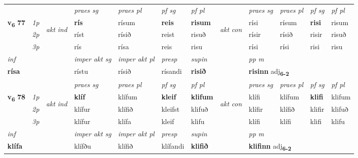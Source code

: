 \begin{longtable}[l]{X>{\footnotesize\itshape}llXXXXlXXXX}
 & &   & \textit{praes sg}  & \textit{praes pl}    & \textit{ pf sg} & \textit{pf pl} & & \textit{praes sg}  & \textit{praes pl}    & \textit{pf sg} & \textit{pf pl }  \\ \cmidrule{4-7} \cmidrule{9-12}
 \multirow{2}{*}{{{\textbf{v{\textsubscript{6}}} \Large{\textbf{77}}}}}  & 1p & \multirow{3}{*}{\begin{turn}{90}\textit{akt ind}\end{turn}} & \textbf{rís} & rísum & \textbf{reis} & \textbf{risum} & \multirow{3}{*}{\begin{turn}{90}\textit{akt con}\end{turn}} &rísi & rísum & \textbf{risi} & risum\\*
 & 2p &  &  ríst  & rísið & reist & risuð & & rísir & rísið & risir & risuð \\*
 & 3p &  & rís & rísa & reis & risu & & rísi & rísi& risi & risu \\*
\cmidrule{4-7} \cmidrule{9-12}

   {\textit{inf}} & &  & \textit{imper akt sg} & \textit{imper akt pl}   & \textit{presp} & \textit{supin}  && \textit{pp m} \\*
  {\textbf{rísa}} & && rístu  & rísið   & rísandi &  \textbf{risið}  && \multicolumn{2}{l}{\textbf{risinn} adj\textbf{\textsubscript{6-2}}} \\*

\midrule

 & &   & \textit{praes sg}  & \textit{praes pl}    & \textit{ pf sg} & \textit{pf pl} & & \textit{praes sg}  & \textit{praes pl}    & \textit{pf sg} & \textit{pf pl }  \\ \cmidrule{4-7} \cmidrule{9-12}
 \multirow{2}{*}{{{\textbf{v{\textsubscript{6}}} \Large{\textbf{78}}}}}  & 1p & \multirow{3}{*}{\begin{turn}{90}\textit{akt ind}\end{turn}} & \textbf{klíf} & klífum & \textbf{kleif} & \textbf{klifum} & \multirow{3}{*}{\begin{turn}{90}\textit{akt con}\end{turn}} &klífi & klífum & \textbf{klifi} & klifum\\*
 & 2p &  &  klífur  & klífið & kleifst & klifuð & & klífir & klífið & klifir & klifuð \\*
 & 3p &  & klífur & klífa & kleif & klifu & & klífi & klífi& klifi & klifu \\*
\cmidrule{4-7} \cmidrule{9-12}

   {\textit{inf}} & &  & \textit{imper akt sg} & \textit{imper akt pl}   & \textit{presp} & \textit{supin}  && \textit{pp m} \\*
  {\textbf{klífa}} & && klífðu  & klífið   & klífandi &  \textbf{klifið}  && \multicolumn{2}{l}{\textbf{klifinn} adj\textbf{\textsubscript{6-2}}} \\*


\end{longtable}
